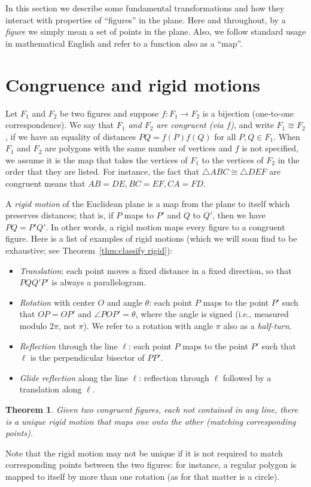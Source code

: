 \documentclass[12pt]{book}
\numberwithin{exc}{section}
\numberwithin{figure}{section}
\newtheorem{theorem}{Theorem}[section]
\numberwithin{equation}{theorem}
\def\ang{\angle}
\begin{document}
In this section we describe some fundamental transformations and how they interact with properties of  ``figures'' in the
plane. Here and throughout, by a \emph{figure}  we simply mean a set of points in the plane. Also, we follow standard usage in mathematical English and refer to a function also as a ``map''.

\section{Congruence and rigid motions}

Let $F_1$ and $F_2$ be two figures and suppose $f: F_1 \to F_2$ is a bijection
(one-to-one correspondence).
We say that \emph{$F_1$ and $F_2$ are congruent (via $f$)},  and write $F_1 \cong F_2$,
if we have an equality of distances $PQ = f(P)f(Q)$ for all
$P,Q \in F_1$. When $F_1$ and $F_2$ are polygons with the same number
of vertices and $f$ is not specified, we assume it is the map that takes
the vertices of $F_1$ to the vertices of $F_2$ in the order that they are
listed. For instance, the fact that $\triangle ABC \cong \triangle DEF$
are congruent means that $AB=DE, BC = EF, CA = FD$.

A \emph{rigid motion} 
of the Euclidean plane is a map from the plane to itself which preserves 
distances; that is, if $P$ maps to $P'$ and $Q$ to $Q'$, then we have 
$PQ = P'Q'$. In other words, a rigid motion maps every figure to a congruent
figure. Here is a list of examples of rigid motions (which we will soon
find to be exhaustive; see Theorem~\ref{thm:classify rigid}):
\begin{itemize}
\item
\textit{Translation}: 
each point moves a fixed distance in a fixed direction, 
so that $PQQ'P'$ is always a parallelogram.
\item
\textit{Rotation} 
with center $O$ and angle $\theta$: each point 
$P$ maps to the point $P'$ such that $OP = OP'$ and $\ang POP' = \theta$, 
where the angle is signed (i.e., measured modulo $2\pi$, not $\pi$).
We refer to a rotation with angle $\pi$ also as a 
\emph{half-turn}. 
\item
\textit{Reflection}  
through the line $\ell$: each point $P$ maps to the point 
$P'$ such that $\ell$ is the perpendicular bisector of $PP'$.
\item
\textit{Glide reflection}  
along the line $\ell$: reflection 
through $\ell$ followed by a translation along $\ell$.
\end{itemize}
\begin{theorem} 
Given two congruent figures, each not contained in any line,
there is a unique rigid motion that maps one onto the other (matching
corresponding points).
\end{theorem} \label{thm:rigid unique}
Note that the rigid motion may not be unique if it is not required to match corresponding points between the two figures: for instance, a regular polygon
is mapped to itself by more than one rotation (as for that matter is a circle).
\end{document}
